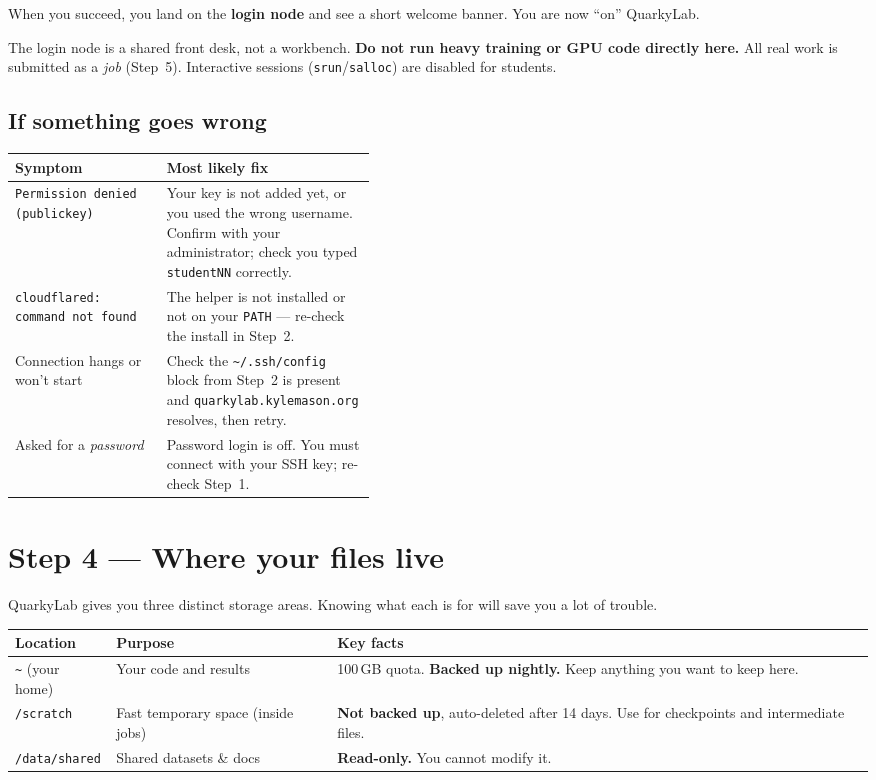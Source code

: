\documentclass[11pt]{article}
\newcommand{\LabName}{QuarkyLab}                       %
\newcommand{\HomeQuota}{100\,GB}                       %
\newcommand{\ScratchPurge}{14 days}                    %
\newcommand{\code}[1]{\texttt{#1}}
\begin{document}
When you succeed, you land on the \textbf{login node} and see a short welcome banner. You are now ``on'' \LabName.

\begin{warnbox}
The login node is a shared front desk, not a workbench. \textbf{Do not run heavy training or GPU code directly here.} All real work is submitted as a \emph{job} (Step~5). Interactive sessions (\code{srun}/\code{salloc}) are disabled for students.
\end{warnbox}

\subsection{If something goes wrong}
\begin{tabularx}{\linewidth}{@{}p{0.42\linewidth}X@{}}
\toprule
\textbf{Symptom} & \textbf{Most likely fix} \\
\midrule
\code{Permission denied (publickey)} & Your key is not added yet, or you used the wrong username. Confirm with your administrator; check you typed \code{studentNN} correctly. \\
\code{cloudflared: command not found} & The helper is not installed or not on your \code{PATH} --- re-check the install in Step~2. \\
Connection hangs or won't start & Check the \code{\textasciitilde/.ssh/config} block from Step~2 is present and \code{quarkylab.kylemason.org} resolves, then retry. \\
Asked for a \emph{password} & Password login is off. You must connect with your SSH key; re-check Step~1. \\
\bottomrule
\end{tabularx}

\section{Step 4 --- Where your files live}
\LabName{} gives you three distinct storage areas. Knowing what each is for will save you a lot of trouble.

\begin{center}
\begin{tabularx}{\linewidth}{@{}l l X@{}}
\toprule
\textbf{Location} & \textbf{Purpose} & \textbf{Key facts} \\
\midrule
\code{\textasciitilde} (your home) & Your code and results & \HomeQuota{} quota. \textbf{Backed up nightly.} Keep anything you want to keep here. \\
\code{/scratch} & Fast temporary space (inside jobs) & \textbf{Not backed up}, auto-deleted after \ScratchPurge. Use for checkpoints and intermediate files. \\
\code{/data/shared} & Shared datasets \& docs & \textbf{Read-only.} You cannot modify it. \\
\bottomrule
\end{tabularx}
\end{center}
\end{document}
